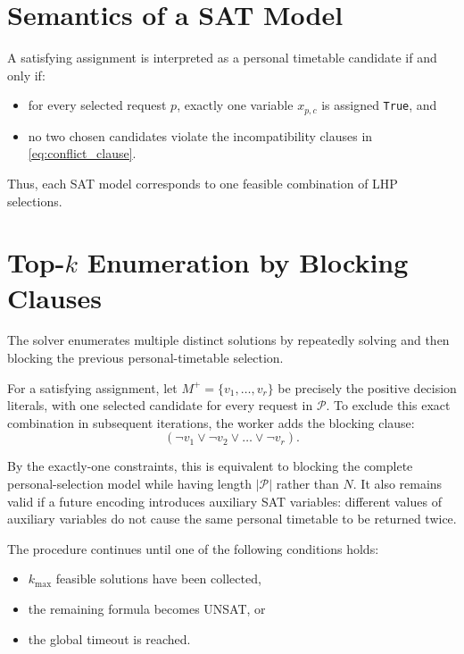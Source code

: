 \documentclass{article}
\begin{document}
\section{Semantics of a SAT Model}

A satisfying assignment is interpreted as a personal timetable candidate if and only if:
\begin{itemize}
    \item for every selected request $p$, exactly one variable $x_{p,c}$ is assigned \texttt{True}, and
    \item no two chosen candidates violate the incompatibility clauses in \eqref{eq:conflict_clause}.
\end{itemize}

Thus, each SAT model corresponds to one feasible combination of LHP selections.

\section{Top-$k$ Enumeration by Blocking Clauses}

The solver enumerates multiple distinct solutions by repeatedly solving and then blocking the previous personal-timetable selection.

For a satisfying assignment, let $M^+ = \{v_1, \dots, v_r\}$ be precisely the
positive decision literals, with one selected candidate for every request in
$\mathcal{P}$. To exclude this exact combination in subsequent iterations, the
worker adds the blocking clause:
\begin{equation}
(\neg v_1 \vee \neg v_2 \vee \dots \vee \neg v_r).
\label{eq:blocking_clause}
\end{equation}

By the exactly-one constraints, this is equivalent to blocking the complete
personal-selection model while having length $|\mathcal{P}|$ rather than $N$.
It also remains valid if a future encoding introduces auxiliary SAT variables:
different values of auxiliary variables do not cause the same personal timetable
to be returned twice.

The procedure continues until one of the following conditions holds:
\begin{itemize}
    \item $k_{\max}$ feasible solutions have been collected,
    \item the remaining formula becomes UNSAT, or
    \item the global timeout is reached.
\end{itemize}
\end{document}
